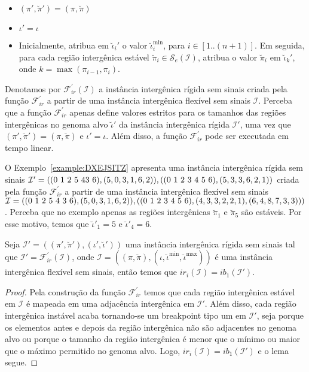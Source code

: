 \begin{itemize}
  \item $(\pi',\breve\pi') = (\pi,\breve\pi)$
  \item $\iota' = \iota$
  \item Inicialmente, atribua em $\breve\iota_{i}'$ o valor $\breve\iota^{\min}_i$, para $i \in [1..({n+1})]$. Em seguida, para cada região intergênica estável $\breve\pi_i \in \mathcal{S}_{e}(\mathcal{I})$, atribua o valor $\breve\pi_i$ em $\breve\iota_{k}'$, onde $k = \max(\pi_{i-1},\pi_i)$.
\end{itemize}

Denotamos por $\mathcal{F}_{ir}^{'}(\mathcal{I})$ a instância intergênica rígida sem sinais criada pela função $\mathcal{F}_{ir}^{'}$ a partir de uma instância intergênica flexível sem sinais $\mathcal{I}$. Perceba que a função $\mathcal{F}_{ir}^{'}$ apenas define valores estritos para os tamanhos das regiões intergênicas no genoma alvo $\breve\iota'$ da instância intergênica rígida $\mathcal{I'}$, uma vez que $(\pi',\breve\pi') = (\pi,\breve\pi)$ e $\iota' = \iota$. Além disso, a função $\mathcal{F}_{ir}^{'}$ pode ser executada em tempo linear. 

\pagebreak

O Exemplo~\ref{example:DXEJSITZ} apresenta uma instância intergênica rígida sem sinais $\mathcal{I}' = ((0~1~2~5~4\break3~6),(5,0,3,1,6,2)),((0~1~2~3~4~5~6),(5,3,3,6,2,1))$ criada pela função $\mathcal{F}_{ir}^{'}$ a partir de uma instância intergênica flexível sem sinais $\mathcal{I}=((0~1~2~5~4~3~6),(5,0,3,1,6,2)),((0~1~2~3~4~5~6),\break(4,3,3,2,2,1),(6,4,8,7,3,3)))$. Perceba que no exemplo apenas as regiões intergênicas $\breve\pi_1$ e $\breve\pi_5$ são estáveis. Por esse motivo, temos que $\breve\iota'_1 = 5$ e $\breve\iota'_4 = 6$.



\begin{lemma}\label{lemma:UFTVNRSX}
Seja $\mathcal{I'} = ((\pi',\breve\pi'),(\iota',\breve\iota'))$ uma instância intergênica rígida sem sinais tal que $\mathcal{I'} = \mathcal{F}_{ir}^{'}(\mathcal{I})$, onde $\mathcal{I} = ((\pi,\breve\pi),(\iota,\breve\iota^{\min},\breve\iota^{\max}))$ é uma instância intergênica flexível sem sinais, então temos que $ir_i(\mathcal{I}) = ib_1(\mathcal{I'})$.
\end{lemma}
\begin{proof}
Pela construção da função $\mathcal{F}_{ir}^{'}$ temos que cada região intergênica estável em $\mathcal{I}$ é mapeada em uma adjacência intergênica em $\mathcal{I'}$. Além disso, cada região intergênica instável acaba tornando-se um breakpoint tipo um em $\mathcal{I'}$, seja porque os elementos antes e depois da região intergênica não são adjacentes no genoma alvo ou porque o tamanho da região intergênica é menor que o mínimo ou maior que o máximo permitido no genoma alvo. Logo, $ir_i(\mathcal{I}) = ib_1(\mathcal{I'})$ e o lema segue.
\end{proof}

